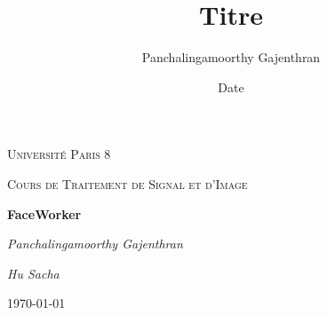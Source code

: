 \documentclass[12pt,a4paper]{article}
\title{Titre}
\author{Panchalingamoorthy Gajenthran}
\date{Date}
\begin{document}
\begin{titlepage}
	\centering
	{\scshape\LARGE Université Paris 8 \par}
	\vspace{1cm}
	{\scshape\Large Cours de Traitement de Signal et d'Image \par}
	\vspace{4.5cm}
	{\huge\bfseries FaceWorker\par}
	\vspace{1cm}
	{\Large\itshape Panchalingamoorthy Gajenthran \par}
	{\Large\itshape Hu Sacha \par}
	\vfill
	
	{\large \today\par}
\end{titlepage}

\tableofcontents

     
\end{document}
